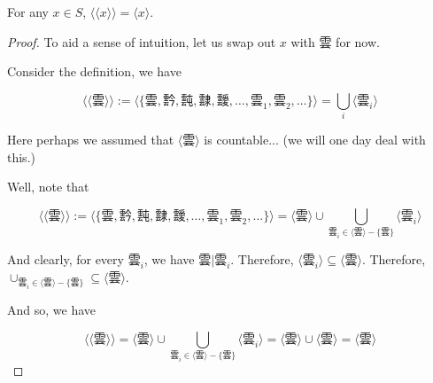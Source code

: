 \begin{theorem}\label{thm:indempotence-of-emergence}
    For any $x\in S$, $\langle \langle x \rangle \rangle = \langle x \rangle$.
\end{theorem}
\begin{proof}
    To aid a sense of intuition, let us swap out $x$ with $\text{雲}$ for now. 

    Consider the definition, we have
    
    $$\langle \langle \text{雲} \rangle \rangle := \langle \{\text{雲}, \text{霒}, \text{霕}, \text{霴}, \text{靉}, \ldots, \text{雲}_{1}, \text{雲}_{2}, \ldots\} \rangle = \bigcup_{i} \langle \text{雲}_{i} \rangle$$ 

    Here perhaps we assumed that $\langle \text{雲} \rangle$ is countable... (we will one day deal with this.)

    Well, note that 

    $$\langle \langle \text{雲} \rangle \rangle := \langle \{\text{雲}, \text{霒}, \text{霕}, \text{霴}, \text{靉}, \ldots, \text{雲}_{1}, \text{雲}_{2}, \ldots\} \rangle = \langle \text{雲} \rangle \cup \bigcup_{\text{雲}_{i}\in 
    \langle \text{雲} \rangle - \{\text{雲}\}} 
     \langle \text{雲}_{i} \rangle$$ 

     And clearly, for every $\text{雲}_{i}$, we have $\text{雲}|\text{雲}_{i}$. Therefore, $\langle \text{雲}_{i} \rangle \subseteq \langle \text{雲} \rangle$. Therefore,$\cup_{\text{雲}_{i}\in 
    \langle \text{雲} \rangle - \{\text{雲}\}} \subseteq \langle \text{雲} \rangle$.
    
And so, we have          
     
    $$\langle \langle \text{雲} \rangle \rangle = 
     \langle \text{雲} \rangle \cup \bigcup_{\text{雲}_{i}\in 
     \langle \text{雲} \rangle - \{\text{雲}\}} 
      \langle \text{雲}_{i} \rangle
       = \langle \text{雲} \rangle \cup \langle \text{雲} \rangle
    =\langle \text{雲} \rangle$$

\end{proof}



